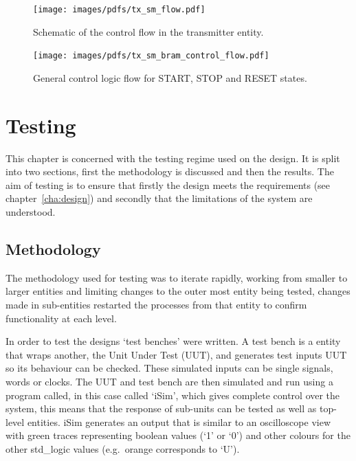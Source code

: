 \begin{figure}[htbp]
  \centering
  \texttt{[image: images/pdfs/tx\_sm\_flow.pdf]}
  \caption{Schematic of the control flow in the transmitter entity.}
  \label{fig:tx_sm_flow}
\end{figure}
  
\begin{figure}[htbp]
  \centering
  \texttt{[image: images/pdfs/tx\_sm\_bram\_control\_flow.pdf]}
  \caption{General control logic flow for START, STOP and RESET states.}
  \label{fig:tx_sm_bram_control_flow}
\end{figure}

\chapter{Testing} %
\label{cha:testing}
This chapter is concerned with the testing regime used on the design. It is split into two sections, first the methodology is discussed and then the results. The aim of testing is to ensure that firstly the design meets the requirements (see chapter~\ref{cha:design}) and secondly that the limitations of the system are understood.
\section{Methodology} %
\label{sec:methodology}
The methodology used for testing was to iterate rapidly, working from smaller to larger entities and limiting changes to the outer most entity being tested, changes made in sub-entities restarted the processes from that entity to confirm functionality at each level. 

In order to test the designs `test benches' were written. A test bench is a entity that wraps another, the Unit Under Test (UUT), and generates test inputs UUT so its behaviour can be checked. These simulated inputs can be single signals, words or clocks. The UUT and test bench are then simulated and run using a program called, in this case called `iSim', which gives complete control over the system, this means that the response of sub-units can be tested as well as top-level entities. iSim generates an output that is similar to an oscilloscope view with green traces representing boolean values (`1' or `0') and other colours for the other std\_logic values (e.g.\ orange corresponds to `U'). 

